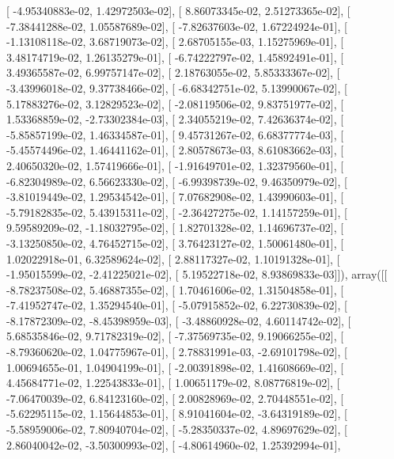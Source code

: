 \documentclass{article}
\begin{document}
       [ -4.95340883e-02,   1.42972503e-02],
       [  8.86073345e-02,   2.51273365e-02],
       [ -7.38441288e-02,   1.05587689e-02],
       [ -7.82637603e-02,   1.67224924e-01],
       [ -1.13108118e-02,   3.68719073e-02],
       [  2.68705155e-03,   1.15275969e-01],
       [  3.48174719e-02,   1.26135279e-01],
       [ -6.74222797e-02,   1.45892491e-01],
       [  3.49365587e-02,   6.99757147e-02],
       [  2.18763055e-02,   5.85333367e-02],
       [ -3.43996018e-02,   9.37738466e-02],
       [ -6.68342751e-02,   5.13990067e-02],
       [  5.17883276e-02,   3.12829523e-02],
       [ -2.08119506e-02,   9.83751977e-02],
       [  1.53368859e-02,  -2.73302384e-03],
       [  2.34055219e-02,   7.42636374e-02],
       [ -5.85857199e-02,   1.46334587e-01],
       [  9.45731267e-02,   6.68377774e-03],
       [ -5.45574496e-02,   1.46441162e-01],
       [  2.80578673e-03,   8.61083662e-03],
       [  2.40650320e-02,   1.57419666e-01],
       [ -1.91649701e-02,   1.32379560e-01],
       [ -6.82304989e-02,   6.56623330e-02],
       [ -6.99398739e-02,   9.46350979e-02],
       [ -3.81019449e-02,   1.29534542e-01],
       [  7.07682908e-02,   1.43990603e-01],
       [ -5.79182835e-02,   5.43915311e-02],
       [ -2.36427275e-02,   1.14157259e-01],
       [  9.59589209e-02,  -1.18032795e-02],
       [  1.82701328e-02,   1.14696737e-02],
       [ -3.13250850e-02,   4.76452715e-02],
       [  3.76423127e-02,   1.50061480e-01],
       [  1.02022918e-01,   6.32589624e-02],
       [  2.88117327e-02,   1.10191328e-01],
       [ -1.95015599e-02,  -2.41225021e-02],
       [  5.19522718e-02,   8.93869833e-03]]), array([[ -8.78237508e-02,   5.46887355e-02],
       [  1.70461606e-02,   1.31504858e-01],
       [ -7.41952747e-02,   1.35294540e-01],
       [ -5.07915852e-02,   6.22730839e-02],
       [ -8.17872309e-02,  -8.45398959e-03],
       [ -3.48860928e-02,   4.60114742e-02],
       [  5.68535846e-02,   9.71782319e-02],
       [ -7.37569735e-02,   9.19066255e-02],
       [ -8.79360620e-02,   1.04775967e-01],
       [  2.78831991e-03,  -2.69101798e-02],
       [  1.00694655e-01,   1.04904199e-01],
       [ -2.00391898e-02,   1.41608669e-02],
       [  4.45684771e-02,   1.22543833e-01],
       [  1.00651179e-02,   8.08776819e-02],
       [ -7.06470039e-02,   6.84123160e-02],
       [  2.00828969e-02,   2.70448551e-02],
       [ -5.62295115e-02,   1.15644853e-01],
       [  8.91041604e-02,  -3.64319189e-02],
       [ -5.58959006e-02,   7.80940704e-02],
       [ -5.28350337e-02,   4.89697629e-02],
       [  2.86040042e-02,  -3.50300993e-02],
       [ -4.80614960e-02,   1.25392994e-01],
\end{document}
